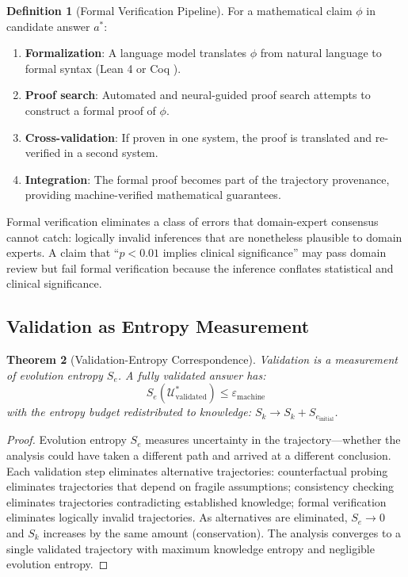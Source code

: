 \documentclass[10pt,twocolumn]{article}
\newtheorem{theorem}{Theorem}[section]
\theoremstyle{definition}
\newtheorem{definition}[theorem]{Definition}
\theoremstyle{remark}
\newcommand{\Sk}{S_k}
\newcommand{\Se}{S_e}
\newcommand{\understanding}{\mathcal{U}}
\newcommand{\Sk}{\mathscr{S}_k}
\newcommand{\Se}{\mathscr{S}_e}
\begin{document}
\begin{definition}[Formal Verification Pipeline]
For a mathematical claim $\phi$ in candidate answer $a^*$:
\begin{enumerate}[nosep]
\item \textbf{Formalization}: A language model translates $\phi$ from natural language to formal syntax (Lean 4 \cite{demoura2021} or Coq \cite{bertot2010}).
\item \textbf{Proof search}: Automated and neural-guided proof search \cite{first2023baldur} attempts to construct a formal proof of $\phi$.
\item \textbf{Cross-validation}: If proven in one system, the proof is translated and re-verified in a second system.
\item \textbf{Integration}: The formal proof becomes part of the trajectory provenance, providing machine-verified mathematical guarantees.
\end{enumerate}
\end{definition}

Formal verification eliminates a class of errors that domain-expert consensus cannot catch: logically invalid inferences that are nonetheless plausible to domain experts. A claim that ``$p < 0.01$ implies clinical significance'' may pass domain review but fail formal verification because the inference conflates statistical and clinical significance.

\subsection{Validation as Entropy Measurement}

\begin{theorem}[Validation-Entropy Correspondence]
\label{thm:validation_entropy}
Validation is a measurement of evolution entropy $\Se$. A fully validated answer has:
\begin{equation}
\Se(\understanding^*_{\text{validated}}) \leq \varepsilon_{\text{machine}}
\end{equation}
with the entropy budget redistributed to knowledge: $\Sk \to \Sk + \Se_{\text{initial}}$.
\end{theorem}

\begin{proof}
Evolution entropy $\Se$ measures uncertainty in the trajectory---whether the analysis could have taken a different path and arrived at a different conclusion. Each validation step eliminates alternative trajectories: counterfactual probing eliminates trajectories that depend on fragile assumptions; consistency checking eliminates trajectories contradicting established knowledge; formal verification eliminates logically invalid trajectories. As alternatives are eliminated, $\Se \to 0$ and $\Sk$ increases by the same amount (conservation). The analysis converges to a single validated trajectory with maximum knowledge entropy and negligible evolution entropy.
\end{proof}
\end{document}
